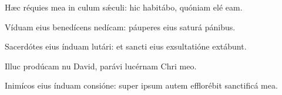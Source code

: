 \item Hæc réquies mea in culum sǽculi:\psstar{} hic habitábo, quóniam elé eam.

\item Víduam eius benedícens nedícam:\psstar{} páuperes eius saturá pánibus.

\item Sacerdótes eius índuam lutári:\psstar{} et sancti eius exsultatióne extábunt.

\item Illuc prodúcam nu David,\psstar{} parávi lucérnam Chri meo.

\item Inimícos eius índuam consióne:\psstar{} super ipsum autem efflorébit sanctificá mea.

